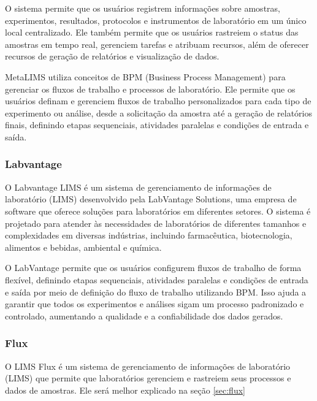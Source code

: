 O sistema permite que os usuários registrem informações sobre amostras, experimentos, resultados, protocolos e instrumentos de laboratório em um único local centralizado. Ele também permite que os usuários rastreiem o status das amostras em tempo real, gerenciem tarefas e atribuam recursos, além de oferecer recursos de geração de relatórios e visualização de dados.

MetaLIMS utiliza conceitos de BPM (Business Process Management) para gerenciar os fluxos de trabalho e processos de laboratório. Ele permite que os usuários definam e gerenciem fluxos de trabalho personalizados para cada tipo de experimento ou análise, desde a solicitação da amostra até a geração de relatórios finais, definindo etapas sequenciais, atividades paralelas e condições de entrada e saída.

\subsubsection{Labvantage}

O Labvantage LIMS é um sistema de gerenciamento de informações de laboratório (LIMS) desenvolvido pela LabVantage Solutions, uma empresa de software que oferece soluções para laboratórios em diferentes setores. O sistema é projetado para atender às necessidades de laboratórios de diferentes tamanhos e complexidades em diversas indústrias, incluindo farmacêutica, biotecnologia, alimentos e bebidas, ambiental e química.

O LabVantage permite que os usuários configurem fluxos de trabalho de forma flexível, definindo etapas sequenciais, atividades paralelas e condições de entrada e saída por meio de definição do fluxo de trabalho utilizando BPM. Isso ajuda a garantir que todos os experimentos e análises sigam um processo padronizado e controlado, aumentando a qualidade e a confiabilidade dos dados gerados.

\subsubsection{Flux}

O LIMS Flux é um sistema de gerenciamento de informações de laboratório (LIMS) que permite que laboratórios gerenciem e rastreiem seus processos e dados de amostras. Ele será melhor explicado na seção \ref{sec:flux}



